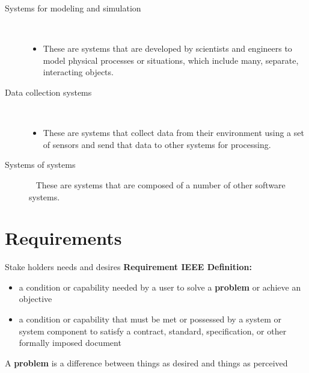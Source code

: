 \documentclass{report}
\begin{document}
\begin{description}
  \item [Systems for modeling and simulation] \
  \begin{itemize}
    \setlength\itemsep{-.25em}
    \item These are systems that are developed by scientists and engineers
to model physical processes or situations, which include many,
separate, interacting objects.
  \end{itemize}
  \item [Data collection systems] \
  \begin{itemize}
    \setlength\itemsep{-.25em}
    \item These are systems that collect data from their environment using a
set of sensors and send that data to other systems for processing.
  \end{itemize}
  \item [Systems of systems] \ \newline
These are systems that are composed of a number of other software systems.
\end{description}

\newpage
\section{Requirements}
Stake holders needs and desires\newline
\textbf{Requirement IEEE Definition:}
  \begin{itemize}
    \setlength\itemsep{-.25em}
    \item a condition or capability needed by a user to solve a \textbf{problem} or achieve an objective
    \item a condition or capability that must be met or possessed by a system or system component to satisfy a contract, standard, specification, or other formally imposed document
  \end{itemize}
A \textbf{problem} is a difference between things as desired and things as perceived
\end{document}
